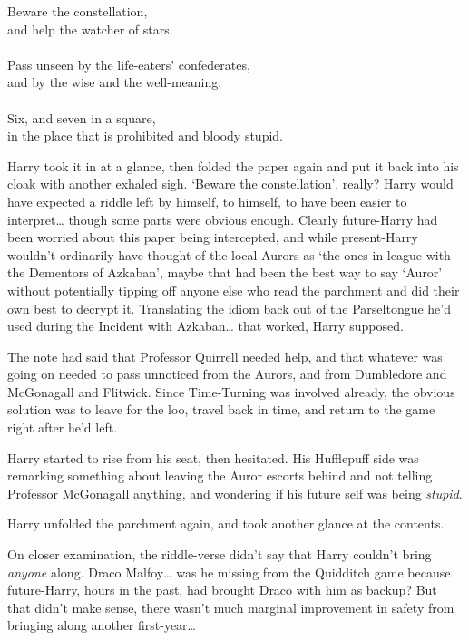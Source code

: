 \begin{writtenNote}
Beware the constellation,\\
and help the watcher of stars.\\
\\
Pass unseen by the life-eaters' confederates,\\
and by the wise and the well-meaning.\\
\\
Six, and seven in a square,\\
in the place that is prohibited and bloody stupid.
\end{writtenNote}

Harry took it in at a glance, then folded the paper again and put it back into his cloak with another exhaled sigh. `Beware the constellation', really? Harry would have expected a riddle left by himself, to himself, to have been easier to interpret{\ldots} though some parts were obvious enough. Clearly future-Harry had been worried about this paper being intercepted, and while present-Harry wouldn't ordinarily have thought of the local Aurors as `the ones in league with the Dementors of Azkaban', maybe that had been the best way to say `Auror' without potentially tipping off anyone else who read the parchment and did their own best to decrypt it. Translating the idiom back out of the Parseltongue he'd used during the Incident with Azkaban{\ldots} that worked, Harry supposed.

The note had said that Professor Quirrell needed help, and that whatever was going on needed to pass unnoticed from the Aurors, and from Dumbledore and McGonagall and Flitwick. Since Time-Turning was involved already, the obvious solution was to leave for the loo, travel back in time, and return to the game right after he'd left.

Harry started to rise from his seat, then hesitated. His Hufflepuff side was remarking something about leaving the Auror escorts behind and not telling Professor McGonagall anything, and wondering if his future self was being \emph{stupid}.

Harry unfolded the parchment again, and took another glance at the contents.

On closer examination, the riddle-verse didn't say that Harry couldn't bring \emph{anyone} along. Draco Malfoy{\ldots} was he missing from the Quidditch game because future-Harry, hours in the past, had brought Draco with him as backup? But that didn't make sense, there wasn't much marginal improvement in safety from bringing along another first-year{\ldots}

